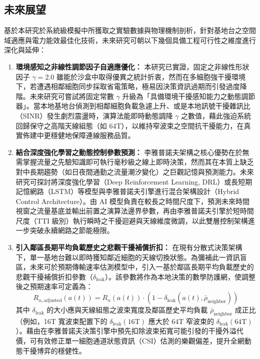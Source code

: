 \subsection{未來展望}
基於本研究於系統級模擬中所獲取之實驗數據與物理機制剖析，針對基地台之空間域適應與電力能效最佳化技術，未來研究可朝以下幾個具備工程可行性之維度進行深化與延伸：

\begin{enumerate}
    \item \textbf{環境感知之非線性調節因子自適應優化：} 本研究已實證，固定之非線性形狀因子 $\gamma = 2.0$ 雖能於沙盒中取得優異之統計折衷，然而在多細胞強干擾環境下，若遭遇相鄰細胞同步採取省電策略，極易因決策資訊過期而引發過度降階。未來研究可嘗試將固定常數 $\gamma$ 升級為「具備環境干擾感知能力之動態調節器」。當本地基地台偵測到相鄰細胞負載急遽上升、或是本地訊號干擾雜訊比（SINR）發生劇烈震盪時，演算法能即時動態調降 $\gamma$ 之數值，藉此強迫系統回歸保守之高階天線組態（如 64T），以維持窄波束之空間抗干擾能力，在真實佈建中更穩健地保障連線服務品質。

    \item \textbf{結合深度強化學習之動態控制參數預測：} 李雅普諾夫架構之核心優勢在於無需掌握流量之先驗知識即可執行毫秒級之線上即時決策，然而其在本質上缺乏對中長期趨勢（如日夜間通勤之流量潮汐變化）之巨觀記憶與預測能力。未來研究可探討將深度強化學習（Deep Reinforcement Learning, DRL）或長短期記憶網路（LSTM）等模型與李雅普諾夫引擎進行混合架構設計（Hybrid Control Architecture）。由 AI 模型負責在較長之時間尺度下，預測未來時間視窗之流量基底並輸出前置之演算法邊界參數，再由李雅普諾夫引擎於短時間尺度（TTI 級別）執行瞬時之干擾迴避與天線維度微調，以此雙層控制架構進一步突破永續網路之節能極限。

    \item \textbf{引入鄰區長期平均負載歷史之悲觀干擾補償折扣：}
    在現有分散式決策架構下，單一基地台難以即時獲知鄰近細胞的天線切換狀態。為彌補此一資訊盲區，未來可於預期傳輸速率估測模型中，引入一基於鄰區長期平均負載歷史的悲觀干擾補償折扣參數（$\delta_{\text{leak}}$）。該參數將作為本地決策的數學防護網，使調整後之預期速率可定義為：
    \begin{equation}
    R_{n, \text{adjusted}}(a(t)) = R_n(a(t)) \cdot (1 - \delta_{\text{leak}}(a(t), \bar{\rho}_{\text{neighbor}}))
    \end{equation}
    其中 $\delta_{\text{leak}}$ 的大小應與天線組態之波束寬度及鄰區歷史平均負載 $\bar{\rho}_{\text{neighbor}}$ 成正比（例如，16T 寬波束配置下的 $\delta_{\text{leak}}(16\text{T})$ 應大於 64T 窄波束的 $\delta_{\text{leak}}(64\text{T})$）。藉由在李雅普諾夫決策引擎中預先扣除波束拓寬可能引發的干擾外溢代價，可有效修正單一細胞通道狀態資訊（CSI）估測的樂觀偏差，提升全網動態干擾博弈的穩健性。


\end{enumerate}
